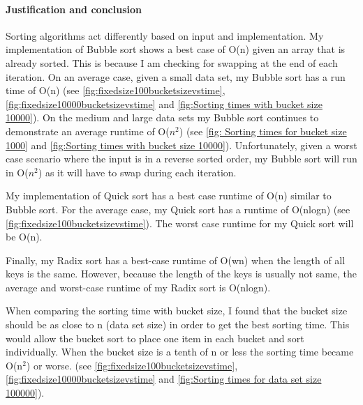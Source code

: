 \documentclass[10pt,letterpaper]{report}
\begin{document}
\paragraph{Justification and conclusion}
Sorting algorithms act differently based on input and implementation. My implementation of Bubble sort shows a best case of O(n) given an array that is already sorted. This is because I am checking for swapping at the end of each iteration. On an average case, given a small data set, my Bubble sort has a run time of O(n) (see \ref{fig:fixedsize100bucketsizevstime}, \ref{fig:fixedsize10000bucketsizevstime} and \ref{fig:Sorting times with bucket size 10000}). On the medium and large data sets my Bubble sort continues to demonstrate an average runtime of O($n^2$) (see \ref{fig: Sorting times for bucket size 1000} and \ref{fig:Sorting times with bucket size 10000}). Unfortunately, given a worst case scenario where the input is in a reverse sorted order, my Bubble sort will run in O($n^2$) as it will have to swap during each iteration. 

My implementation of Quick sort has a best case runtime of O(n) similar to Bubble sort.  For the average case, my Quick sort has a runtime of O(nlogn) (see \ref{fig:fixedsize100bucketsizevstime}).
The worst case runtime for my Quick sort will be O(n). 

Finally, my Radix sort has a best-case runtime of O(wn) when the length of all keys is the same. However, because the length of the keys is usually not same, the average and worst-case runtime of my Radix sort is O(nlogn).

When comparing the sorting time with bucket size, I found that the bucket size should be as close to n (data set size) in order to get the best sorting time. This would allow the bucket sort to place one item in each bucket and sort individually. When the bucket size is a tenth of n or less the sorting time became O(n$^2$) or worse. (see \ref{fig:fixedsize100bucketsizevstime}, \ref{fig:fixedsize10000bucketsizevstime} and \ref{fig:Sorting times for data set size 100000}).

	
\end{document}
